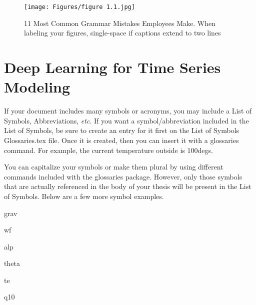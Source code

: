 \begin{figure}[ht]
    \centering
    \texttt{[image: Figures/figure 1.1.jpg]}
    \caption[11 Most Common Grammar Mistakes Employees Make: I'm purposely making this longer to extend to two lines.]{11 Most Common Grammar Mistakes Employees Make. When labeling your figures, single-space if captions extend to two lines}
    \label{fig 1.1}
\end{figure}

\section{Deep Learning for Time Series Modeling}

If your document includes many symbols or acronyms, you may include a List of Symbols, Abbreviations, \textit{etc}. If you want a symbol/abbreviation included in the List of Symbols, be sure to create an entry for it first on the List of Symbols Glossaries.tex file. Once it is created, then you can insert it with a glossaries command. For example, the current temperature outside is 100\glspl{deg}.

You can capitalize your symbols or make them plural by using different commands included with the glossaries package. However, only those symbols that are actually referenced in the body of your thesis will be present in the List of Symbols. Below are a few more symbol examples.

\gls{grav}

\gls{wf}

\gls{alp}

\gls{theta}

\gls{te}

\gls{q10}



